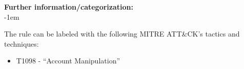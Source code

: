 {\bf Further information/categorization:} \\

\openup -1em
\vspace{-2em}


The rule can be labeled with the following MITRE ATT\&CK's tactics and techniques:
\begin{itemize}
	\item T1098 - ``Account Manipulation''
\end{itemize}

\pagebreak

